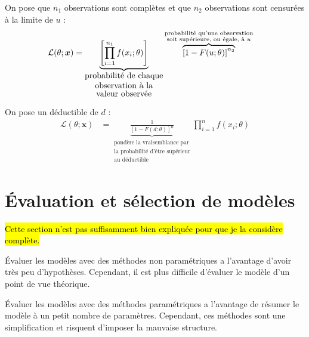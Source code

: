 \documentclass[french]{article}
\begin{document}
\begin{multicols*}{2}
\begin{definitionNOHFILLprop}
On pose que $n_{1}$ observations sont complètes et que $n_{2}$ observations sont censurées à la limite de $u$ :
\begin{align*}
	\mathcal{L}(\theta; \bm{x})
	&=	\underbrace{\left[\prod^{n_{1}}_{i	=	1} f(x_{i}; \theta) \right]}_{\shortstack{probabilité de chaque\\ observation à la\\ valeur observée}} \overbrace{\left[1	-	F(u; \theta)\right]^{n_{2}}}^{\substack{\text{probabilité qu'une observation}\\ \text{soit supérieure, ou égale, à $u$}}}
\end{align*}
\end{definitionNOHFILLprop}

\begin{definitionNOHFILLprop}
On pose un déductible de $d$ : 
\begin{align*}
	\mathcal{L}(\theta; \bm{x})
	&=	\underbrace{\frac{1}{\left[1	-	F(d; \theta)\right]^{n}}}_{\substack{\text{pondère la vraisemblance par}\\ \text{la probabilité d'être supérieur}\\ \text{au déductible}}} \prod^{n}_{i	=	1} f(x_{i}; \theta)
\end{align*}
\end{definitionNOHFILLprop}




\newpage
\section{Évaluation et sélection de modèles}\label{sec:EvalSelModels}
\hl{Cette section n'est pas suffisamment bien expliquée pour que je la considère complète.}

\bigskip

\begin{rappel_enhanced}[Contexte]
Évaluer les modèles avec des méthodes non paramétriques a l'avantage d'avoir très peu d'hypothèses. Cependant, il est plus difficile d'évaluer le modèle d'un point de vue théorique.

Évaluer les modèles avec des méthodes paramétriques a l'avantage de résumer le modèle à un petit nombre de paramètres. Cependant, ces méthodes sont une simplification et risquent d'imposer la mauvaise structure.
\end{rappel_enhanced}


\end{multicols*}
\end{document}
